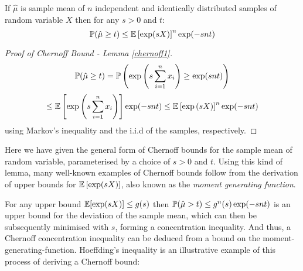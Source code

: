 \begin{lemma}\label{chernoff1}
If $\hat{\mu}$ is sample mean of $n$ independent and identically distributed samples of random variable $X$ then for any $s>0$ and $t$:
\[ \operatorname{\mathbb{P}}(\hat{\mu}\ge t)\le\operatorname{\mathbb{E}}\left[\exp(sX)\right]^n\exp(-snt) \]
\end{lemma}
\begin{proof}[Proof of Chernoff Bound - Lemma \ref{chernoff1}]
$$\operatorname{\mathbb{P}}(\hat{\mu}\ge t) =  \operatorname{\mathbb{P}}\left(\exp\left(s\sum_{i=1}^nx_i\right)\ge \exp(snt)\right)$$
$$\le \operatorname{\mathbb{E}}\left[\exp\left(s\sum_{i=1}^nx_i\right)\right]\exp(-snt) \le \operatorname{\mathbb{E}}\left[\exp\left(sX\right)\right]^n\exp(-snt)
$$
using Markov's inequality and the i.i.d of the samples, respectively.
\end{proof}

Here we have given the general form of Chernoff bounds for the sample mean of random variable, parameterised by a choice of $s>0$ and $t$.
Using this kind of lemma, many well-known examples of Chernoff bounds follow from the derivation of upper bounds for $\operatorname{\mathbb{E}}\left[\exp(sX)\right]$, also known as the \textit{moment generating function}.

For any upper bound $\operatorname{\mathbb{E}}[\exp(sX)]\le g(s)$ then $\operatorname{\mathbb{P}}(\hat{\mu}>t)\le g^n(s)\exp(-snt)$ is an upper bound for the deviation of the sample mean, which can then be subsequently minimised with $s$, forming a concentration inequality.
And thus, a Chernoff concentration inequality can be deduced from a bound on the moment-generating-function.
Hoeffding's inequality \citep{hoeffding1} is an illustrative example of this process of deriving a Chernoff bound:

